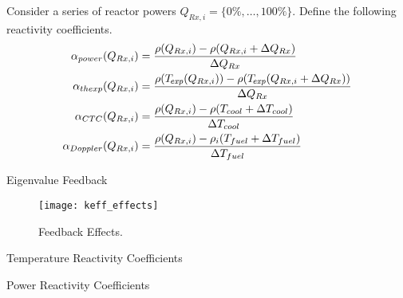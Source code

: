 \begin{frame}
  Consider a series of reactor powers $Q_{Rx,i} = \{0\%,\ldots,100\%\}$.
  Define the following reactivity coefficients.
  \begin{align}
    \label{eq:power_reactivity_coefficient}
    \alpha_{power}(Q_{Rx,i}) &= \frac{\rho(Q_{Rx,i}) - \rho(Q_{Rx,i} + 
      \Delta Q_{Rx})} {\Delta Q_{Rx}} \\
    \label{eq:thermal_expansion_reactivity_coefficient}
    \alpha_{thexp}(Q_{Rx,i}) &= \frac{\rho({T_{\!\mbox{\scriptsize \em exp}}}(Q_{Rx,i})) -
      \rho({T_{\!\mbox{\scriptsize \em exp}}}(Q_{Rx,i} + \Delta Q_{Rx}))}{\Delta Q_{Rx}} \\
    \label{eq:doppler_reactivity_coefficient}
    \alpha_{CTC}(Q_{Rx,i}) &= \frac{\rho(Q_{Rx,i}) - \rho(T_{cool} + 
      \Delta T_{cool})} {\Delta T_{cool}} \\
    \label{eq:coolant_temperature_reactivity_coefficient}
    \alpha_{Doppler}(Q_{Rx,i}) &= \frac{\rho(Q_{Rx,i}) - \rho_i(T_{fuel} + 
      \Delta T_{fuel})} {\Delta T_{fuel}}
  \end{align}
\end{frame}

\begin{frame}{Eigenvalue Feedback}
  \begin{figure}
    \centering
    \texttt{[image: keff\_effects]}
    \caption{\keff Feedback Effects.}
    \label{fig:keff_effects}
  \end{figure}
\end{frame}

\begin{frame}{Temperature Reactivity Coefficients}
  \begin{figure}
    \centering
    \hspace*{\fill}
  \end{figure}
\end{frame}

\begin{frame}{Power Reactivity Coefficients}
  \begin{figure}
    \centering
    \hspace*{\fill}
  \end{figure}
\end{frame}
